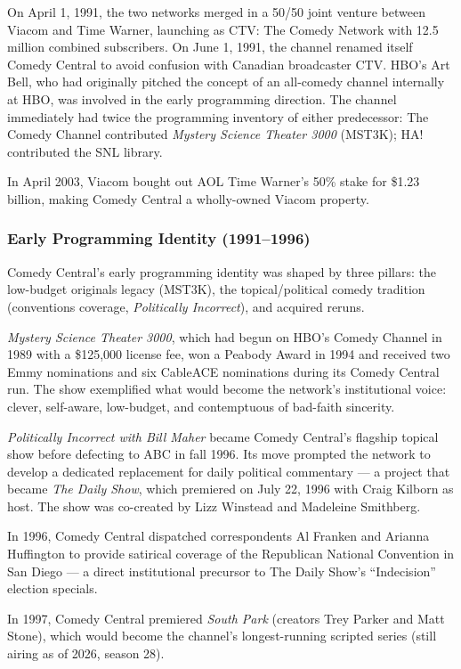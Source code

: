 \documentclass[11pt,letterpaper]{article}
\begin{document}
On April 1, 1991, the two networks merged in a 50/50 joint venture between Viacom and Time Warner, launching as CTV: The Comedy Network with 12.5 million combined subscribers. On June 1, 1991, the channel renamed itself Comedy Central to avoid confusion with Canadian broadcaster CTV. HBO's Art Bell, who had originally pitched the concept of an all-comedy channel internally at HBO, was involved in the early programming direction. The channel immediately had twice the programming inventory of either predecessor: The Comedy Channel contributed \textit{Mystery Science Theater 3000} (MST3K); HA! contributed the SNL library.

In April 2003, Viacom bought out AOL Time Warner's 50\% stake for \$1.23 billion, making Comedy Central a wholly-owned Viacom property.

\subsubsection{Early Programming Identity (1991--1996)}

Comedy Central's early programming identity was shaped by three pillars: the low-budget originals legacy (MST3K), the topical/political comedy tradition (conventions coverage, \textit{Politically Incorrect}), and acquired reruns.

\textit{Mystery Science Theater 3000}, which had begun on HBO's Comedy Channel in 1989 with a \$125,000 license fee, won a Peabody Award in 1994 and received two Emmy nominations and six CableACE nominations during its Comedy Central run. The show exemplified what would become the network's institutional voice: clever, self-aware, low-budget, and contemptuous of bad-faith sincerity.

\textit{Politically Incorrect with Bill Maher} became Comedy Central's flagship topical show before defecting to ABC in fall 1996. Its move prompted the network to develop a dedicated replacement for daily political commentary --- a project that became \textit{The Daily Show}, which premiered on July 22, 1996 with Craig Kilborn as host. The show was co-created by Lizz Winstead and Madeleine Smithberg.

In 1996, Comedy Central dispatched correspondents Al Franken and Arianna Huffington to provide satirical coverage of the Republican National Convention in San Diego --- a direct institutional precursor to The Daily Show's ``Indecision'' election specials.

In 1997, Comedy Central premiered \textit{South Park} (creators Trey Parker and Matt Stone), which would become the channel's longest-running scripted series (still airing as of 2026, season 28).
\end{document}
